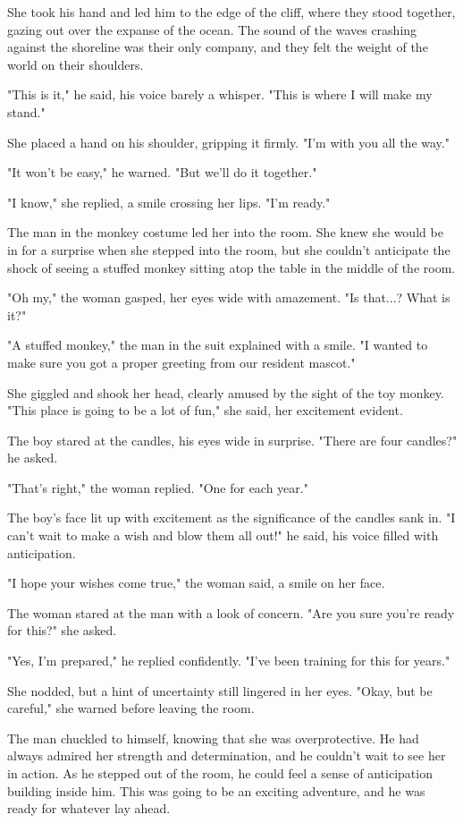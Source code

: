 \documentclass[smalldemyvopaper,11pt,twoside,onecolumn,openright,extrafontsizes]{memoir}
\begin{document}
She took his hand and led him to the edge of the cliff, where they stood together, gazing out over the expanse of the ocean. The sound of the waves crashing against the shoreline was their only company, and they felt the weight of the world on their shoulders.\par
"This is it," he said, his voice barely a whisper. "This is where I will make my stand."\par
She placed a hand on his shoulder, gripping it firmly. "I'm with you all the way."\par
"It won't be easy," he warned. "But we'll do it together."\par
"I know," she replied, a smile crossing her lips. "I'm ready."\par
The man in the monkey costume led her into the room. She knew she would be in for a surprise when she stepped into the room, but she couldn't anticipate the shock of seeing a stuffed monkey sitting atop the table in the middle of the room.\par
"Oh my," the woman gasped, her eyes wide with amazement. "Is that...? What is it?"\par
"A stuffed monkey," the man in the suit explained with a smile. "I wanted to make sure you got a proper greeting from our resident mascot."\par
She giggled and shook her head, clearly amused by the sight of the toy monkey. "This place is going to be a lot of fun," she said, her excitement evident.\par
The boy stared at the candles, his eyes wide in surprise. "There are four candles?" he asked.\par
"That's right," the woman replied. "One for each year."\par
The boy's face lit up with excitement as the significance of the candles sank in. "I can't wait to make a wish and blow them all out!" he said, his voice filled with anticipation.\par
"I hope your wishes come true," the woman said, a smile on her face.\par
The woman stared at the man with a look of concern. "Are you sure you're ready for this?" she asked.\par
"Yes, I'm prepared," he replied confidently. "I've been training for this for years."\par
She nodded, but a hint of uncertainty still lingered in her eyes. "Okay, but be careful," she warned before leaving the room.\par
The man chuckled to himself, knowing that she was overprotective. He had always admired her strength and determination, and he couldn't wait to see her in action. As he stepped out of the room, he could feel a sense of anticipation building inside him. This was going to be an exciting adventure, and he was ready for whatever lay ahead.\par
\end{document}
